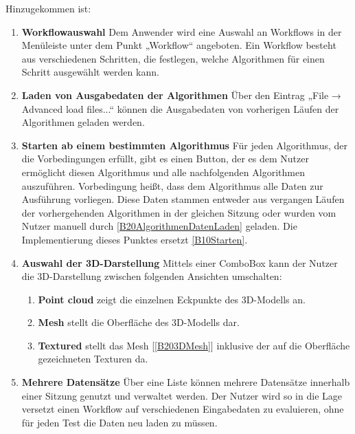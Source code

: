 Hinzugekommen ist:
\begin{enumerate}[ align=left, label={\textbf{\textbackslash B20\arabic*0\textbackslash}}]
	\item \textbf{Workflowauswahl} Dem Anwender wird eine Auswahl an Workflows in der Menüleiste unter dem Punkt „Workflow“ angeboten. Ein Workflow besteht aus verschiedenen Schritten, die festlegen, welche Algorithmen für einen Schritt ausgewählt werden kann.
	\item \textbf{Laden von Ausgabedaten der Algorithmen} \label{B20AlgorithmenDatenLaden} Über den Eintrag „File → Advanced load files...“ können die Ausgabedaten von vorherigen Läufen der Algorithmen geladen werden.
	\item \textbf{Starten ab einem bestimmten Algorithmus} Für jeden Algorithmus, der die Vorbedingungen erfüllt, gibt es einen Button, der es dem Nutzer ermöglicht diesen Algorithmus und alle nachfolgenden Algorithmen auszuführen. Vorbedingung heißt, dass dem Algorithmus alle Daten zur Ausführung vorliegen. Diese Daten stammen entweder aus vergangen Läufen der vorhergehenden Algorithmen in der gleichen Sitzung oder wurden vom Nutzer manuell durch \ref{B20AlgorithmenDatenLaden} geladen. Die Implementierung dieses Punktes ersetzt \ref{B10Starten}.
	\item \textbf{Auswahl der 3D-Darstellung} Mittels einer ComboBox kann der Nutzer die 3D-Darstellung zwischen folgenden Ansichten umschalten:
		\begin{enumerate}[ label={\textbf{\alph*}}, ref={\textbf{\textbackslash B20\arabic{enumi}0\textbackslash\alph*}} ]
			\item \textbf{Point cloud} zeigt die einzelnen Eckpunkte des 3D-Modells an.
			\item \textbf{Mesh} \label{B203DMesh} stellt die Oberfläche des 3D-Modells dar.
			\item \textbf{Textured} stellt das Mesh [\ref{B203DMesh}] inklusive der auf die Oberfläche gezeichneten Texturen da.
		\end{enumerate}
	\item \textbf{Mehrere Datensätze} Über eine Liste können mehrere Datensätze innerhalb einer Sitzung genutzt und verwaltet werden. Der Nutzer wird so in die Lage versetzt einen Workflow auf verschiedenen Eingabedaten zu evaluieren, ohne für jeden Test die Daten neu laden zu müssen.
\end{enumerate}